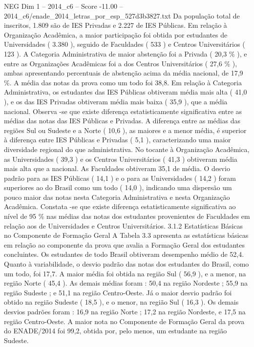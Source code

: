 \begin{textsample}{NEG Dim 1 – 2014\_c6 – Score -11.00 – 2014\_c6/enade\_2014\_letras\_por\_esp\_527d3b3827.txt}
Da população total de inscritos, 1.809 são de IES Privadas e 2.227 de IES Públicas.
Em relação à Organização Acadêmica, a maior participação foi obtida por estudantes de Universidades ( 3.380 ), seguido de Faculdades ( 533 ) e Centros Universitários ( 123 ).
A Categoria Administrativa de maior abstenção foi a Privada ( 20,3 \% ), e entre as Organizações Acadêmicas foi a dos Centros Universitários ( 27,6 \% ), ambas apresentando percentuais de abstenção acima da média nacional, de 17,9 \%.
A média das notas da prova como um todo foi 38,8.
Em relação à Categoria Administrativa, os estudantes das IES Públicas obtiveram média mais alta ( 41,0 ), e os das IES Privadas obtiveram média mais baixa ( 35,9 ), que a média nacional.
Observa -se que existe diferença estatisticamente significativa entre as médias das notas das IES Públicas e Privadas.
A diferença entre as médias das regiões Sul ou Sudeste e a Norte ( 10,6 ), as maiores e a menor média, é superior à diferença entre IES Públicas e Privadas ( 5,1 ), caracterizando uma maior diversidade regional do que administrativa.
No tocante à Organização Acadêmica, as Universidades ( 39,3 ) e os Centros Universitários ( 41,3 ) obtiveram média mais alta que a nacional.
As Faculdades obtiveram 35,1 de média.
O desvio padrão para as IES Públicas ( 14,1 ) e o para as Universidades ( 14,2 ) foram superiores ao do Brasil como um todo ( 14,0 ), indicando uma dispersão um pouco maior das notas nesta Categoria Administrativa e nesta Organização Acadêmica.
Constata -se que existe diferença estatisticamente significativa ao nível de 95 \% nas médias das notas dos estudantes provenientes de Faculdades em relação aos de Universidades e Centros Universitários. 3.1.2 Estatísticas Básicas no Componente de Formação Geral A Tabela 3.3 apresenta as estatísticas básicas em relação ao componente da prova que avalia a Formação Geral dos estudantes concluintes.
Os estudantes de todo Brasil obtiveram desempenho médio de 52,4.
Quanto à variabilidade, o desvio padrão das notas dos estudantes do Brasil, como um todo, foi 17,7.
A maior média foi obtida na região Sul ( 56,9 ), e a menor, na região Norte ( 45,4 ).
As demais médias foram : 50,4 na região Nordeste ; 55,9 na região Sudeste ; e 51,1 na região Centro-Oeste.
Já o maior desvio padrão foi obtido na região Sudeste ( 18,5 ), e o menor, na região Sul ( 16,3 ).
Os demais desvios padrões foram : 16,9 na região Norte ; 17,2 na região Nordeste, e 17,5 na região Centro-Oeste.
A maior nota no Componente de Formação Geral da prova do ENADE/2014 foi 99,2, obtida por, pelo menos, um estudante na região Sudeste.

\end{textsample}
